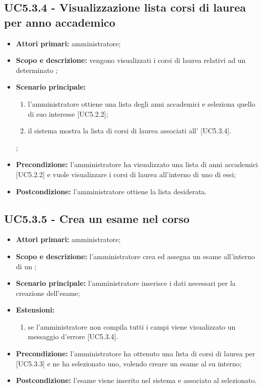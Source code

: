 \documentclass[AnalisiDeiRequisiti.tex]{subfiles}
\begin{document}
\subsection{UC5.3.4 - Visualizzazione lista corsi di laurea per anno accademico}
\begin{itemize}
	\item \textbf{Attori primari:} amministratore;
	\item \textbf{Scopo e descrizione:} vengono visualizzati i corsi di laurea relativi ad un determinato ;
	\item \textbf{Scenario principale:}
	\begin{enumerate}
		\item l'amministratore ottiene una lista degli anni accademici e seleziona quello di suo interesse [UC5.2.2];
		\item il sistema mostra la lista di corsi di laurea associati all' [UC5.3.4].
	\end{enumerate};
	\item \textbf{Precondizione:} l'amministratore ha visualizzato una lista di anni accademici [UC5.2.2] e vuole visualizzare i corsi di laurea all'interno di uno di essi; 
	\item \textbf{Postcondizione:} l'amministratore ottiene la lista desiderata.
\end{itemize}
\subsection{UC5.3.5 - Crea un esame nel corso}
\begin{itemize}
	\item \textbf{Attori primari:} amministratore;
	\item \textbf{Scopo e descrizione:} l'amministratore crea ed assegna un esame all'interno di un ;
	\item \textbf{Scenario principale:} l'amministratore inserisce i dati necessari per la creazione dell'esame;
	\item \textbf{Estensioni:}
	\begin{enumerate}
		\item se l'amministratore non compila tutti i campi viene visualizzato un messaggio d'errore [UC5.3.4].
	\end{enumerate}
	\item \textbf{Precondizione:} l'amministratore ha ottenuto una lista di corsi di laurea per  [UC5.3.3] e ne ha selezionato uno, volendo creare un esame al su interno; 
	\item \textbf{Postcondizione:} l'esame viene inserito nel sistema e associato al  selezionato.
\end{itemize}
\end{document}
